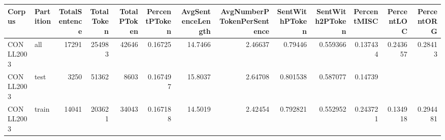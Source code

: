 \begin{tabular}{llrrrrrrrrrrr}
\hline
 Corpus    & Partition   &   TotalSentence &   TotalToken &   TotalPToken &   PercentPToken &   AvgSentenceLength &   AvgNumberPTokenPerSentence &   SentWithPToken &   SentWith2PToken &   PercentMISC &   PercentLOC &   PercentORG \\
\hline
 CONLL2003 & all         &           17291 &       254983 &         42646 &        0.16725  &             14.7466 &                      2.46637 &         0.79446  &          0.559366 &      0.137434 &     0.243657 &     0.28413  \\
 CONLL2003 & test        &            3250 &        51362 &          8603 &        0.167497 &             15.8037 &                      2.64708 &         0.801538 &          0.587077 &      0.14739  &              &              \\
 CONLL2003 & train       &           14041 &       203621 &         34043 &        0.167188 &             14.5019 &                      2.42454 &         0.792821 &          0.552952 &      0.243721 &     0.134918 &     0.294481 \\
\hline
\end{tabular}